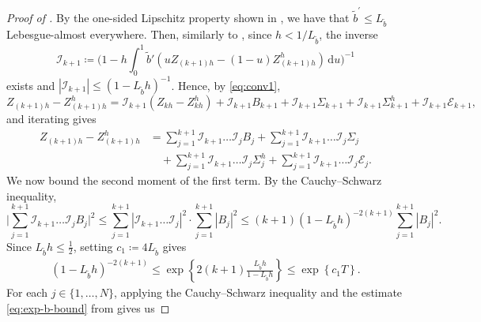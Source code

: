 \documentclass[onseside, final]{amsart}
\theoremstyle{definition}
\newcommand{\D}{\,\mathrm{d}}
\numberwithin{equation}{section}
\begin{document}
\begin{proof}[Proof of ]
			By the one-sided Lipschitz property shown in , we have that $\tilde b^\prime \leq L_{\tilde b}$ Lebesgue-almost everywhere.
			Then, similarly to \citep[Proof of Theorem 2.4]{Hu96}, since $h<1/L_{\tilde b}$, the inverse 
			\begin{equation}
				\mathcal I_{k + 1} \coloneqq \biggl(1 - h\int_0^1 \tilde b'(uZ_{(k+1)h} -(1-u)Z^h_{(k+1)h}) \D u\biggr)^{-1}
			\end{equation}
			exists and $|\mathcal I_{k + 1}| \leq (1-L_{\tilde b} h)^{-1}$.
			Hence, by \eqref{eq:conv1},
			\begin{equation}
				Z_{(k+1)h} -Z^h_{(k+1)h}=\mathcal{I}_{k + 1} (Z_{kh} -Z^h_{kh} ) 
				+\mathcal{I}_{k + 1} B_{k + 1} + \mathcal{I}_{k + 1}\Sigma_{k + 1} + \mathcal{I}_{k + 1}\Sigma^h_{k + 1} + \mathcal{I}_{k + 1}  \mathcal E_{k + 1},
			\end{equation}
			and iterating gives
			\begin{equation}\label{eq:conv1a}
				\begin{aligned}
					Z_{(k+1)h} -Z^h_{(k+1)h} & =
					\sum_{j=1}^{k+1} \mathcal{I}_{k+1} \dots \mathcal{I}_{j} B_j +
					\sum_{j=1}^{k+1} \mathcal{I}_{k+1} \dots \mathcal{I}_{j} \Sigma_j\\
					& \quad +
					\sum_{j=1}^{k+1} \mathcal{I}_{k+1} \dots \mathcal{I}_{j} \Sigma^h_j +
					\sum_{j=1}^{k+1} \mathcal{I}_{k+1} \dots \mathcal{I}_{j} \mathcal E_j.
				\end{aligned}
			\end{equation}
			We now bound the second moment of the first term. By the Cauchy--Schwarz inequality,
			\begin{equation}\label{eq:conv2}
				\Big|\sum_{j=1}^{k+1} \mathcal{I}_{k+1} \dots \mathcal{I}_{j} B_j\Big|^2 \leq \sum_{j=1}^{k+1} | \mathcal{I}_{k+1} \dots \mathcal{I}_{j}|^2 \cdot \sum_{j=1}^{k+1} |B_j|^{2} \leq (k + 1)(1-L_{\tilde b}h)^{-2(k+1)}\sum_{j=1}^{k+1} |B_j|^{2}.
			\end{equation}
			Since $L_{\tilde b} h \leq \frac12$, setting $c_1 \coloneqq 4L_{\tilde b}$ gives
			\begin{equation}\label{eq:conv3}
				\begin{aligned}
					(1-L_{\tilde b}h)^{-2(k+1)} \leq \exp\!\left\{2(k+1)\frac{L_{\tilde b}h}{1 - L_{\tilde b}h}\right\}\! \leq \exp\!\left\{c_1 T\right\}\!.
				\end{aligned}
			\end{equation}
			For each $j \in \{1, \dotsc, N\}$, applying the Cauchy--Schwarz inequality and the estimate \eqref{eq:exp-b-bound} from  gives us

\end{proof}
\end{document}
